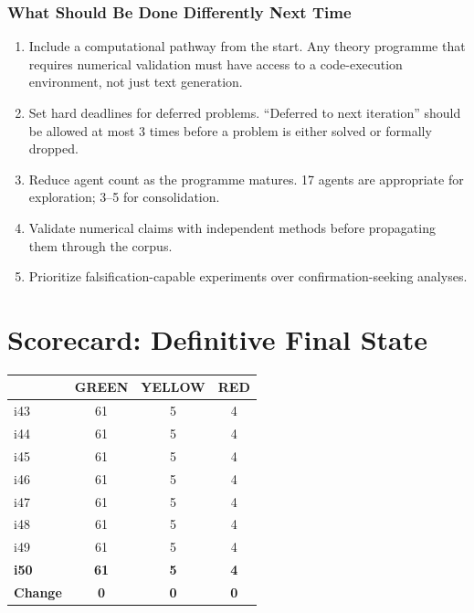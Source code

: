 \documentclass[11pt,a4paper]{article}
\newcommand{\GREEN}{\textcolor{dfdgreen}{\textbf{GREEN}}}
\newcommand{\YELLOW}{\textcolor{dfdyellow}{\textbf{YELLOW}}}
\newcommand{\RED}{\textcolor{dfdred}{\textbf{RED}}}
\begin{document}
\section{What Should Be Done Differently Next Time}

\begin{enumerate}
\item Include a computational pathway from the start. Any theory programme that requires numerical validation must have access to a code-execution environment, not just text generation.
\item Set hard deadlines for deferred problems. ``Deferred to next iteration'' should be allowed at most 3 times before a problem is either solved or formally dropped.
\item Reduce agent count as the programme matures. 17 agents are appropriate for exploration; 3--5 for consolidation.
\item Validate numerical claims with independent methods before propagating them through the corpus.
\item Prioritize falsification-capable experiments over confirmation-seeking analyses.
\end{enumerate}


\part{Scorecard: Definitive Final State}
\label{part:scorecard}

\begin{center}
\begin{tabular}{lccc}
\toprule
& \textbf{\GREEN} & \textbf{\YELLOW} & \textbf{\RED} \\
\midrule
i43 & 61 & 5 & 4 \\
i44 & 61 & 5 & 4 \\
i45 & 61 & 5 & 4 \\
i46 & 61 & 5 & 4 \\
i47 & 61 & 5 & 4 \\
i48 & 61 & 5 & 4 \\
i49 & 61 & 5 & 4 \\
\textbf{i50} & \textbf{61} & \textbf{5} & \textbf{4} \\
\textbf{Change} & \textbf{0} & \textbf{0} & \textbf{0} \\
\bottomrule
\end{tabular}
\end{center}
\end{document}
